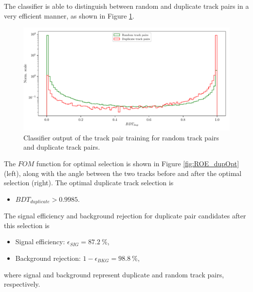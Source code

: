 The classifier is able to distinguish between random and duplicate track pairs in a very efficient manner, as shown in Figure \ref{fig:ROE_dupBDT}.

\begin{figure}[H]
	\centering
	\captionsetup{width=0.8\linewidth}
	\includegraphics[width=\linewidth]{fig/ROECleanup_dup}
	\caption{Classifier output of the track pair training for random track pairs and duplicate track pairs.}
	\label{fig:ROE_dupBDT}
\end{figure}

The $FOM$ function for optimal selection is shown in Figure \ref{fig:ROE_dupOpt} (left), along with the angle between the two tracks before and after the optimal selection (right). The optimal duplicate track selection is
\begin{itemize}
	\item $BDT_{duplicate} > 0.9985.$
\end{itemize}

The signal efficiency and background rejection for duplicate pair candidates after this selection is
\begin{itemize}
	\item Signal efficiency: $\epsilon_{SIG} = 87.2~\%$,
	\item Background rejection: $1-\epsilon_{BKG} = 98.8~\%$,
\end{itemize}
where signal and background represent duplicate and random track pairs, respectively.


